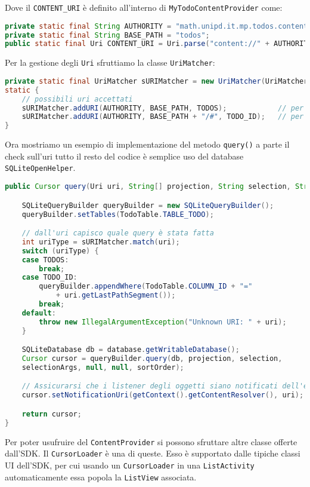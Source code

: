 Dove il \lstinline|CONTENT_URI| è definito all'interno di \lstinline|MyTodoContentProvider| come:
\begin{lstlisting}[language=Java]
private static final String AUTHORITY = "math.unipd.it.mp.todos.contentprovider";
private static final String BASE_PATH = "todos";
public static final Uri CONTENT_URI = Uri.parse("content://" + AUTHORITY + "/" + BASE_PATH);
\end{lstlisting}

Per la gestione degli \lstinline|Uri| sfruttiamo la classe \lstinline|UriMatcher|:
\begin{lstlisting}[language=Java]
private static final UriMatcher sURIMatcher = new UriMatcher(UriMatcher.NO_MATCH);
static {
	// possibili uri accettati
	sURIMatcher.addURI(AUTHORITY, BASE_PATH, TODOS);			// per lista oggetti
	sURIMatcher.addURI(AUTHORITY, BASE_PATH + "/#", TODO_ID);	// per singolo oggetto
}
\end{lstlisting}

Ora mostriamo un esempio di implementazione del metodo \lstinline|query()| a parte il check sull'uri tutto il resto del codice è semplice uso del database \lstinline|SQLiteOpenHelper|.
\begin{lstlisting}[language=Java]
public Cursor query(Uri uri, String[] projection, String selection, String[] selectionArgs, String sortOrder) {

	SQLiteQueryBuilder queryBuilder = new SQLiteQueryBuilder();
	queryBuilder.setTables(TodoTable.TABLE_TODO);

	// dall'uri capisco quale query è stata fatta
	int uriType = sURIMatcher.match(uri);
	switch (uriType) {
	case TODOS:
		break;
	case TODO_ID:
		queryBuilder.appendWhere(TodoTable.COLUMN_ID + "="
			+ uri.getLastPathSegment());
		break;
	default:
		throw new IllegalArgumentException("Unknown URI: " + uri);
	}

	SQLiteDatabase db = database.getWritableDatabase();
	Cursor cursor = queryBuilder.query(db, projection, selection,
	selectionArgs, null, null, sortOrder);

	// Assicurarsi che i listener degli oggetti siano notificati dell'evento
	cursor.setNotificationUri(getContext().getContentResolver(), uri);

	return cursor;
}
\end{lstlisting}

Per poter usufruire del \texttt{ContentProvider} si possono sfruttare altre classe offerte dall'SDK. Il \lstinline|CursorLoader| è una di queste. Esso è supportato dalle tipiche classi UI dell'SDK, per cui usando un \lstinline|CursorLoader| in una \lstinline|ListActivity| automaticamente essa popola la \lstinline|ListView| associata.

